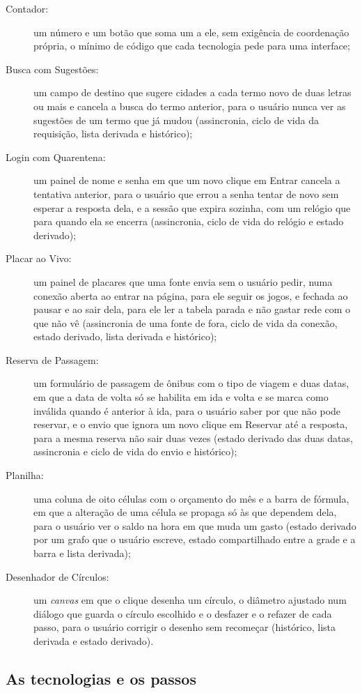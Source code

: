 \begin{description}
\item[{Contador:}] um número e um botão que soma um a ele, sem exigência de
coordenação própria, o mínimo de código que cada tecnologia pede para
uma interface;
\item[{Busca com Sugestões:}] um campo de destino que sugere cidades a cada
termo novo de duas letras ou mais e cancela a busca do termo anterior,
para o usuário nunca ver as sugestões de um termo que já mudou
(assincronia, ciclo de vida da requisição, lista derivada e
histórico);
\item[{Login com Quarentena:}] um painel de nome e senha em que um novo
clique em Entrar cancela a tentativa anterior, para o usuário que errou
a senha tentar de novo sem esperar a resposta dela, e a sessão que
expira sozinha, com um relógio que para quando ela se encerra
(assincronia, ciclo de vida do relógio e estado derivado);
\item[{Placar ao Vivo:}] um painel de placares que uma fonte envia sem o
usuário pedir, numa conexão aberta ao entrar na página, para ele seguir
os jogos, e fechada ao pausar e ao sair dela, para ele ler a tabela
parada e não gastar rede com o que não vê (assincronia de uma fonte de
fora, ciclo de vida da conexão, estado derivado, lista derivada e
histórico);
\item[{Reserva de Passagem:}] um formulário de passagem de ônibus com o tipo
de viagem e duas datas, em que a data de volta só se habilita em ida e
volta e se marca como inválida quando é anterior à ida, para o usuário
saber por que não pode reservar, e o envio que ignora um novo clique
em Reservar até a resposta, para a mesma reserva não sair duas vezes
(estado derivado das duas datas, assincronia e ciclo de vida do envio
e histórico);
\item[{Planilha:}] uma coluna de oito células com o orçamento do mês e a
barra de fórmula, em que a alteração de uma célula se propaga só às
que dependem dela, para o usuário ver o saldo na hora em que muda um
gasto (estado derivado por um grafo que o usuário escreve, estado
compartilhado entre a grade e a barra e lista derivada);
\item[{Desenhador de Círculos:}] um \emph{canvas} em que o clique desenha um
círculo, o diâmetro ajustado num diálogo que guarda o círculo escolhido
e o desfazer e o refazer de cada passo, para o usuário corrigir o
desenho sem recomeçar (histórico, lista derivada e estado derivado).
\end{description}
\subsection{As tecnologias e os passos}
\label{sec:as-tecnologias-e-os-passos}

